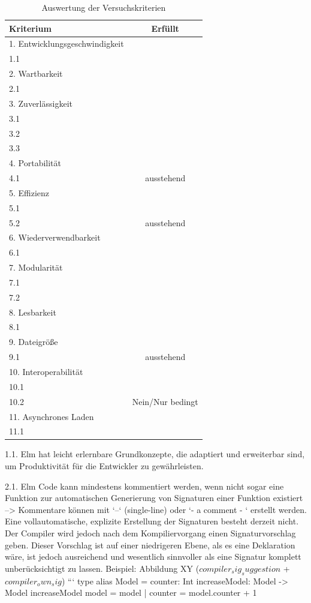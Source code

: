 \begin{table}[h]
\centering
\begin{tabular}{ | l | c | }
	\hline
	\textbf{Kriterium} & \textbf{Erfüllt}\\
	\hline
	1. Entwicklungsgeschwindigkeit & \\
	1.1 & \checkmark\\
	\hline
	2. Wartbarkeit & \\
	2.1  & \checkmark\\
	\hline
	3. Zuverlässigkeit & \\
	3.1  & \checkmark\\
	3.2  & \checkmark\\
	3.3  & \checkmark\\
	\hline
	4. Portabilität & \\
	4.1  & ausstehend\\
	\hline
	5. Effizienz & \\
	5.1  & \checkmark\\
	5.2  & ausstehend\\
	\hline
	6. Wiederverwendbarkeit & \\
	6.1  & \checkmark\\
	\hline
	7. Modularität & \\
	7.1  & \checkmark\\
	7.2  & \checkmark\\
	\hline
	8. Lesbarkeit & \\
	8.1  & \checkmark\\	
	\hline
	9. Dateigröße & \\
	9.1  & ausstehend\\
	\hline
	10. Interoperabilität & \\
	10.1  & \checkmark\\
	10.2  & Nein/Nur bedingt\\
	\hline
	11. Asynchrones Laden & \\
	11.1  & \checkmark\\
	\hline
\end{tabular}
\caption{Auswertung der Versuchskriterien}
\label{tab:Auswertungstabelle}
\end{table}

 1.1. Elm hat leicht erlernbare Grundkonzepte, die adaptiert und erweiterbar sind, um Produktivität für die Entwickler zu gewährleisten.
 
 2.1. Elm Code kann mindestens kommentiert werden, wenn nicht sogar eine Funktion zur automatischen Generierung von Signaturen einer Funktion existiert
 --> Kommentare können mit `--` (single-line) oder `{- a comment - }` erstellt werden. Eine vollautomatische, explizite Erstellung der Signaturen besteht derzeit nicht. Der Compiler wird jedoch nach dem Kompiliervorgang einen Signaturvorschlag geben. Dieser Vorschlag ist auf einer niedrigeren Ebene, als es eine Deklaration wäre, ist jedoch ausreichend und wesentlich sinnvoller als eine Signatur komplett unberücksichtigt zu lassen. Beispiel: Abbildung XY ($compiler_sig_suggestion$ + $compiler_own_sig$)
 ```
 type alias Model = { counter: Int }
 increaseModel: Model -> Model
 increaseModel model =
     {model | counter = model.counter + 1}
 
